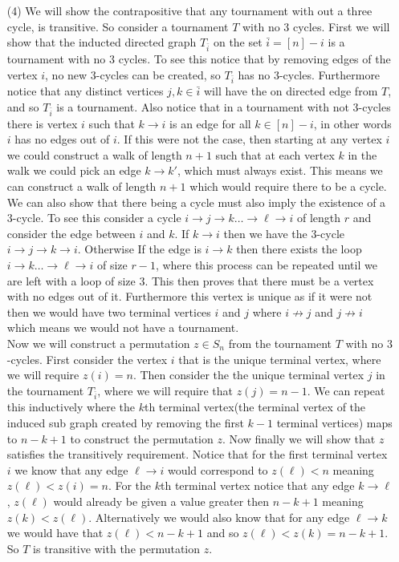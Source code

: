 \documentclass[12pt]{amsart}
\theoremstyle{definition}
\newcommand{\ra}{\rightarrow}
\begin{document}
\begin{itemize}
\item[(4)] %
We will show the contrapositive that any tournament with out a three cycle, is transitive. 
So consider a tournament $T$ with no $3$ cycles. 
First we will show that the inducted directed graph $T_{\bar{i}}$ on the set $\bar{i}=[n]-i$ is a tournament with no $3$ cycles. To see this notice that by removing edges of the vertex $i$, no new $3$-cycles can be created, so $T_{\bar{i}}$ has no $3$-cycles. Furthermore notice that any distinct vertices $j,k\in\bar{i}$ will have the on directed edge from $T$, and so $T_{\bar{i}}$ is a tournament.
Also notice that in a tournament with not $3$-cycles there is vertex $i$ such that $k\ra i$ is an edge for all $k\in [n]-i$, in other words $i$ has no edges out of $i$. If this were not the case, then starting at any vertex $i$ we could construct a walk of length $n+1$ such that at each vertex $k$ in the walk we could pick an edge $k\ra k'$, which must always exist. This means we can construct a walk of length $n+1$ which would require there to be a cycle. We can also show that there being a cycle must also imply the existence of a $3$-cycle. To see this consider a cycle $i\ra j \ra k \dots \ra \ell \ra i$ of length $r$ and consider the edge between $i$ and $k$. If $k\ra i$ then we have the $3$-cycle $i\ra j\ra k \ra i$. Otherwise If the edge is $i\ra k$ then there exists the loop $i \ra k \dots \ra \ell \ra i$ of size $r-1$, where this process can be repeated until we are left with a loop of size $3$. This then proves that there must be a vertex with no edges out of it. Furthermore this vertex is unique as if it were not then we would have two terminal vertices $i$ and $j$ where $i\not\ra j$ and $j\not\ra i$ which means we would not have a tournament.\\


Now we will construct a permutation $z\in S_n$ from the tournament $T$ with no $3$-cycles. First consider the vertex $i$ that is the unique terminal vertex, where we will require $z(i)=n$. Then consider the the unique terminal vertex $j$ in the tournament $T_{\bar{i}}$, where we will require that $z(j)=n-1$. 
We can repeat this inductively where the $k$th terminal vertex(the terminal vertex of the induced sub graph created by removing the first $k-1$ terminal vertices) maps to $n-k+1$ to construct the permutation $z$. Now finally we will show that $z$ satisfies the transitively requirement. 
Notice that for the first terminal vertex $i$ we know that any edge $\ell\ra i$ would correspond to $z(\ell)< n$ meaning $z(\ell)<z(i)=n$. For the $k$th terminal vertex notice that any edge $k\ra \ell$, $z(\ell)$ would already be given a value greater then $n-k+1$ meaning $z(k)<z(\ell)$. Alternatively we would also know that for any edge $\ell\ra k$ we would have that $z(\ell)<n-k+1$ and so $z(\ell)<z(k)=n-k+1$. So $T$ is transitive with the permutation $z$.\\


\end{itemize}
\end{document}
